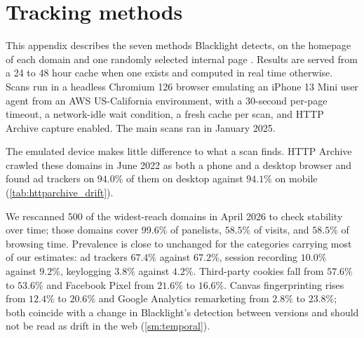 \documentclass[12pt, letterpaper]{article}
\begin{document}
\clearpage
\FloatBarrier
\section{Tracking methods}\label{sm:bl_tracking_mechanisms}

This appendix describes the seven methods Blacklight detects, on the homepage of each domain and one randomly selected internal page \citep{blacklight}. Results are served from a 24 to 48 hour cache when one exists and computed in real time otherwise. Scans run in a headless Chromium 126 browser emulating an iPhone 13 Mini user agent from an AWS US-California environment, with a 30-second per-page timeout, a network-idle wait condition, a fresh cache per scan, and HTTP Archive capture enabled. The main scans ran in January 2025.
 
The emulated device makes little difference to what a scan finds. HTTP Archive crawled these domains in June 2022 as both a phone and a desktop browser and found ad trackers on $94.0\%$ of them on desktop against $94.1\%$ on mobile (\cref{tab:httparchive_drift}).
 
We rescanned 500 of the widest-reach domains in April 2026 to check stability over time; those domains cover $99.6\%$ of panelists, $58.5\%$ of visits, and $58.5\%$ of browsing time. Prevalence is close to unchanged for the categories carrying most of our estimates: ad trackers $67.4\%$ against $67.2\%$, session recording $10.0\%$ against $9.2\%$, keylogging $3.8\%$ against $4.2\%$. Third-party cookies fall from $57.6\%$ to $53.6\%$ and Facebook Pixel from $21.6\%$ to $16.6\%$. Canvas fingerprinting rises from $12.4\%$ to $20.6\%$ and Google Analytics remarketing from $2.8\%$ to $23.8\%$; both coincide with a change in Blacklight's detection between versions and should not be read as drift in the web (\cref{sm:temporal}).
\end{document}
